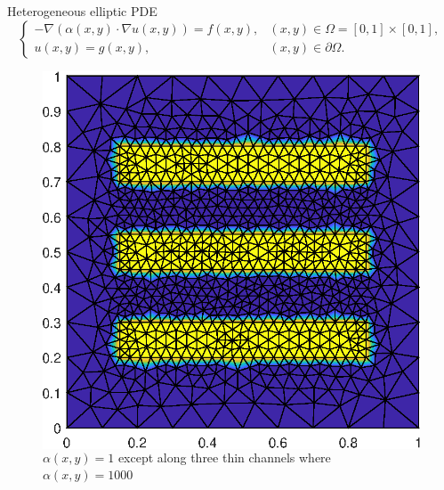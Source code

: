 \documentclass{beamer}
\begin{document}
\begin{frame}{Heterogeneous elliptic PDE}
\begin{equation*}
	\begin{cases} -\nabla \left ( \alpha(x,y) \cdot \nabla u(x,y) \right ) = f(x,y), & (x,y) \in \Omega = [0,1] \times [0,1], \\
		u(x,y) = g(x,y), & (x,y) \in \partial \Omega. %
	\end{cases}
\end{equation*}

\begin{figure}
	\begin{columns}
	\centering
	\includegraphics[height=0.6\textheight]{AOSM/PLOT_LonelandK_Seminar.eps}
	\caption{$\alpha(x,y)=1$ except along three thin channels where $\alpha(x,y)=1000$}
	\end{columns}
\end{figure}
\end{frame}
\end{document}
